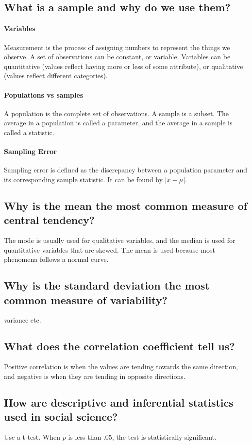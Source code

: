 \documentclass[10pt,letter]{article}
\theoremstyle{plain}
\theoremstyle{definition}
\begin{document}
\subsection*{What is a sample and why do we use them?}
\paragraph{Variables}
Measurement is the process of assigning numbers to represent the things we observe. A set of observations can be constant, or variable. Variables can be quantitative (values reflect having more or less of some attribute), or qualitative (values reflect different categories). 
\paragraph{Populations vs samples}
A population is the complete set of observations. A sample is a subset. The average in a population is called a parameter, and the average in a sample is called a statistic. 
\paragraph{Sampling Error}
Sampling error is defined as the discrepancy between a population parameter and its corresponding sample statistic. It can be found by $|\bar{x}-\mu|$. 

\subsection*{Why is the mean the most common measure of central tendency?}
The mode is usually used for qualitative variables, and the median is used for quantitative variables that are skewed. The mean is used because most phenomena follows a normal curve. 

\subsection*{Why is the standard deviation the most common measure of variability?}
variance etc.

\subsection*{What does the correlation coefficient tell us?}
Positive correlation is when the values are tending towards the same direction, and negative is when they are tending in opposite directions. 


\subsection*{How are descriptive and inferential statistics used in social science?}
Use a t-test. When $p$ is less than $.05$, the test is statistically significant. 
\end{document}
